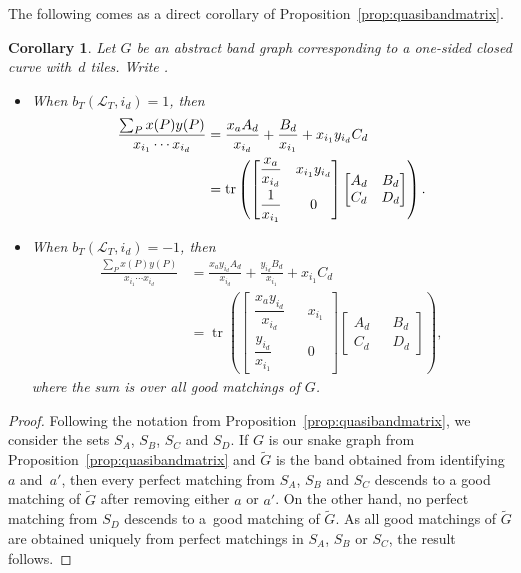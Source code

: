 \documentclass[pdftex]{sigma}
\numberwithin{equation}{section}
\newtheorem{Corollary}[Theorem]{Corollary}
\theoremstyle{definition}
\begin{document}
The following comes as a direct corollary of Proposition~\ref{prop:quasibandmatrix}.

\begin{Corollary}\label{cor:matrixformula}
Let $G$ be an abstract band graph corresponding to a one-sided closed curve with~$d$ tiles. Write .
\begin{itemize}\itemsep=0pt
\item When $b_T({\mathcal{L}_T}, i_d)=1$, then
\begin{align}
\frac{\sum_P x(P)y(P)}{x_{i_1}\cdots x_{i_d}}&=\frac{x_a A_d}{x_{i_d}}+\frac{B_d}{x_{i_1}}+x_{i_1}y_{i_d}C_d\nonumber\\
&=\operatorname{tr}\left(\begin{bmatrix}
\dfrac{x_a}{x_{i_d}} & x_{i_1}y_{i_d}\vspace{1mm}\\
\dfrac{1}{x_{i_1}} & 0
\end{bmatrix}
\begin{bmatrix}
A_d & B_d\\
C_d & D_d
\end{bmatrix}\right).\label{eqn:matrixformula1+}
\end{align}

\item When $b_T({\mathcal{L}_T}, i_d)=-1$, then
\begin{align}
\frac{\sum_P x(P)y(P)}{x_{i_1}\cdots x_{i_d}}&=\frac{x_ay_{i_d} A_d}{x_{i_d}}+\frac{y_{i_d}B_d}{x_{i_1}}+x_{i_1}C_d\nonumber\\
&=\operatorname{tr}\left(\begin{bmatrix}
\dfrac{x_ay_{i_d}}{x_{i_d}} && x_{i_1}\\
\dfrac{y_{i_d}}{x_{i_1}} && 0
\end{bmatrix}
\begin{bmatrix}
A_d && B_d\\
C_d && D_d
\end{bmatrix}\right), \label{eqn:matrixformula2+}
\end{align}
where the sum is over all good matchings of $G$.
\end{itemize}
\end{Corollary}
\begin{proof}
Following the notation from Proposition~\ref{prop:quasibandmatrix}, we consider the sets $S_A$, $S_B$, $S_C$ and $S_D$. If $G$ is our snake graph from Proposition~\ref{prop:quasibandmatrix} and $\widetilde{G}$ is the band obtained from identifying $a$ and~$a'$, then every perfect matching from $S_A$, $S_B$ and $S_C$ descends to a good matching of $\widetilde{G}$ after removing either $a$ or $a'$. On the other hand, no perfect matching from $S_D$ descends to a~good matching of $\widetilde{G}$. As all good matchings of $\widetilde{G}$ are obtained uniquely from perfect matchings in $S_A$, $S_B$ or $S_C$, the result follows.
\end{proof}
\end{document}

